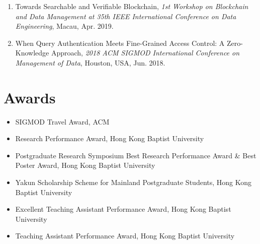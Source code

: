\documentclass{mycv}
\begin{document}
\begin{enumerate}
  \item Towards Searchable and Verifiable Blockchain, \emph{1st Workshop on Blockchain and Data Management at 35th IEEE International Conference on Data Engineering}, Macau, Apr. 2019.
  \item When Query Authentication Meets Fine-Grained Access Control: A Zero-Knowledge Approach, \emph{2018 ACM SIGMOD International Conference on Management of Data}, Houston, USA, Jun. 2018.
\end{enumerate}

\section{Awards}

\begin{itemize}
  \item SIGMOD Travel Award, ACM 
  \item Research Performance Award, Hong Kong Baptist University 
  \item Postgraduate Research Symposium Best Research Performance Award \& Best Poster Award, Hong Kong Baptist University 
  \item Yakun Scholarship Scheme for Mainland Postgraduate Students, Hong Kong Baptist University 
  \item Excellent Teaching Assistant Performance Award, Hong Kong Baptist University 
  \item Teaching Assistant Performance Award, Hong Kong Baptist University 
\end{itemize}
\end{document}
